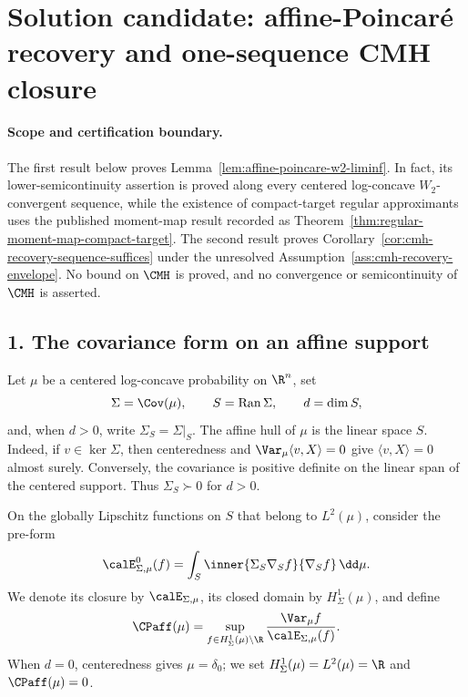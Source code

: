 \documentclass[../main.tex]{subfiles}
\begin{document}
%
\section*{Solution candidate: affine-Poincar\'e recovery and one-sequence CMH closure}
\label{sec:sol-affine-poincare-w2-liminf}

\paragraph{Scope and certification boundary.}
The first result below proves Lemma~\ref{lem:affine-poincare-w2-liminf}.  In fact, its
lower-semicontinuity assertion is proved along every centered log-concave $W_2$-convergent
sequence, while the existence of compact-target regular approximants uses the published
moment-map result recorded as Theorem~\ref{thm:regular-moment-map-compact-target}.  The second
result proves Corollary~\ref{cor:cmh-recovery-sequence-suffices} under the unresolved
Assumption~\ref{ass:cmh-recovery-envelope}.  No bound on $\CMH$ is proved, and no convergence or
semicontinuity of $\CMH$ is asserted.

\subsection*{1. The covariance form on an affine support}

Let $\mu$ be a centered log-concave probability on $\R^n$, set
\[
  \Sigma=\Cov(\mu),\qquad S=\operatorname{Ran}\Sigma,\qquad d=\dim S,
\]
and, when $d>0$, write $\Sigma_S=\Sigma|_S$.  The affine hull of $\mu$ is the linear space
$S$.  Indeed, if $v\in\ker\Sigma$, then centeredness and
$\Var_\mu\langle v,X\rangle=0$ give $\langle v,X\rangle=0$ almost surely.  Conversely, the
covariance is positive definite on the linear span of the centered support.  Thus
$\Sigma_S\succ0$ for $d>0$.

On the globally Lipschitz functions on $S$ that belong to $L^2(\mu)$, consider the pre-form
\begin{equation}
  \calE^0_{\Sigma,\mu}(f)
  =\int_S\inner{\Sigma_S\nabla_S f}{\nabla_S f}\,\dd\mu.
  \label{eq:sol-cmh-recovery-preform}
\end{equation}
We denote its closure by $\calE_{\Sigma,\mu}$, its closed domain by
$H^1_\Sigma(\mu)$, and define
\begin{equation}
  \CPaff(\mu)
  =\sup_{f\in H^1_\Sigma(\mu)\setminus\R}
       \frac{\Var_\mu f}{\calE_{\Sigma,\mu}(f)}.
  \label{eq:sol-cmh-recovery-cpaff}
\end{equation}
When $d=0$, centeredness gives $\mu=\delta_0$; we set
$H^1_\Sigma(\mu)=L^2(\mu)=\R$ and $\CPaff(\mu)=0$.
\end{document}
